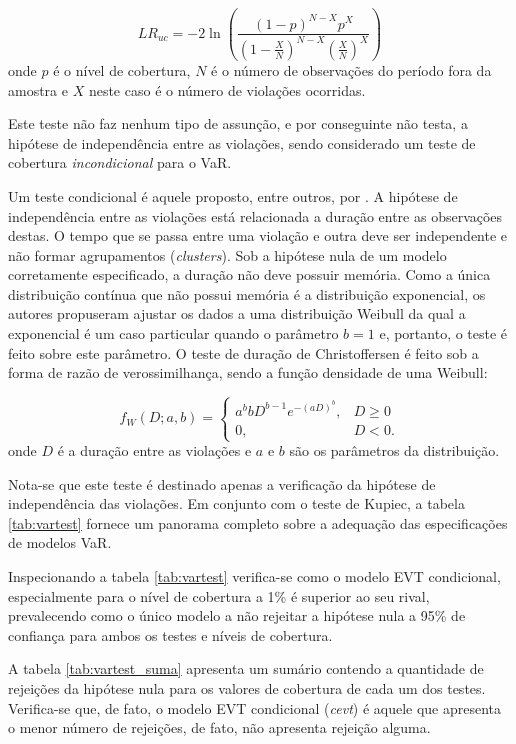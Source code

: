 \documentclass[1p]{elsarticle}
\theoremstyle{definition}
\begin{document}
\begin{equation}
	LR_{uc}=-2\ln\left(\frac{(1-p)^{N-X}p^X}{(1-\frac{X}{N})^{N-X}(\frac{X}{N})^X}\right)
\end{equation}
onde $p$ é o nível de cobertura, $N$ é o número de observações do período fora da amostra e $X$ neste caso é o número de violações ocorridas.

Este teste não faz nenhum tipo de assunção, e por conseguinte não testa, a hipótese de independência entre as violações, sendo considerado um teste de cobertura \emph{incondicional} para o VaR.

Um teste condicional é aquele proposto, entre outros, por \cite{Christoffersen2004}. A hipótese de independência entre as violações está relacionada a duração entre as observações destas. O tempo que se passa entre uma violação e outra deve ser independente e não formar agrupamentos (\emph{clusters}). Sob a hipótese nula de um modelo corretamente especificado, a duração não deve possuir memória. Como a única distribuição contínua que não possui memória é a distribuição exponencial, os autores propuseram ajustar os dados a uma distribuição Weibull da qual a exponencial é um caso particular quando o parâmetro $b=1$ e, portanto, o teste é feito sobre este parâmetro. O teste de duração de Christoffersen é feito sob a forma de razão de verossimilhança, sendo a função densidade de uma Weibull:

\begin{equation}
	f_W(D; a, b) = \begin{cases}
	a^b b D^{b-1}e^{-(aD)^b}, &D \geq 0\\
	0,&D<0.
	\end{cases} 
\end{equation}
onde $D$ é a duração entre as violações e $a$ e $b$ são os parâmetros da distribuição.

Nota-se que este teste é destinado apenas a verificação da hipótese de independência das violações. Em conjunto com o teste de Kupiec, a tabela \ref{tab:vartest} fornece um panorama completo sobre a adequação das especificações de modelos VaR.



Inspecionando a tabela \ref{tab:vartest} verifica-se como o modelo EVT condicional, especialmente para o nível de cobertura a 1\% é superior ao seu rival, prevalecendo como o único modelo a não rejeitar a hipótese nula a 95\% de confiança para ambos os testes e níveis de cobertura.

A tabela \ref{tab:vartest_suma} apresenta um sumário contendo a quantidade de rejeições da hipótese nula para os valores de cobertura de cada um dos testes. Verifica-se que, de fato, o modelo EVT condicional (\emph{cevt}) é aquele que apresenta o menor número de rejeições, de fato, não apresenta rejeição alguma. 
\end{document}
